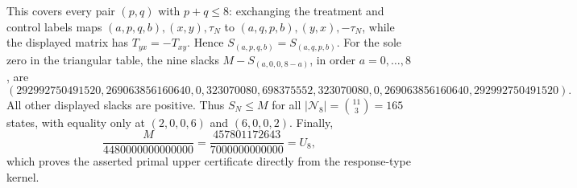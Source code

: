 This covers every pair \((p,q)\) with \(p+q\leq8\): exchanging the treatment and control labels maps \((a,p,q,b),(x,y),\tau_N\) to \((a,q,p,b),(y,x),-\tau_N\), while the displayed matrix has \(T_{yx}=-T_{xy}\).  Hence
\(
 S_{(a,p,q,b)}=S_{(a,q,p,b)}.
\)
For the sole zero in the triangular table, the nine slacks \(M-S_{(a,0,0,8-a)}\), in order \(a=0,\ldots,8\), are
\[
 (292992750491520,269063856160640,0,323070080,698375552,
 323070080,0,269063856160640,292992750491520).
\]
All other displayed slacks are positive.  Thus \(S_N\leq M\) for all
\(
 |\mathcal N_8|=\binom{11}{3}=165
\)
states, with equality only at \((2,0,0,6)\) and \((6,0,0,2)\).  Finally,
\[
 \frac{M}{4480000000000000}
 =\frac{457801172643}{7000000000000}=U_8,
\]
which proves the asserted primal upper certificate directly from the response-type kernel.

